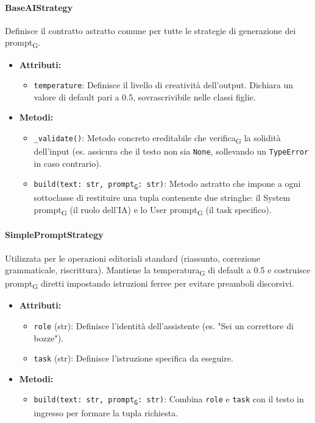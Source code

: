 \documentclass[11pt,a4paper]{article}
\newcommand{\gls}[1]{#1\textsubscript{G}}
\begin{document}
\paragraph{BaseAIStrategy}
Definisce il contratto astratto comune per tutte le strategie di generazione dei \gls{prompt}.
\begin{itemize}
    \item\textbf{Attributi:}
\begin{itemize}
    \item \texttt{temperature}: Definisce il livello di creatività dell'output. Dichiara un valore di default pari a 0.5, sovrascrivibile nelle classi figlie.
\end{itemize}
    \item \textbf{Metodi:}
\begin{itemize}
    \item \texttt{\_validate()}: Metodo concreto ereditabile che \gls{verifica} la solidità dell'input (es. assicura che il testo non sia \texttt{None}, sollevando un \texttt{TypeError} in caso contrario).
    \item \texttt{build(text: str, \gls{prompt}: str)}: Metodo astratto che impone a ogni sottoclasse di restituire una tupla contenente due stringhe: il \gls{System prompt} (il ruolo dell'IA) e lo \gls{User prompt} (il task specifico).
\end{itemize}
\end{itemize}

\paragraph{SimplePromptStrategy}
Utilizzata per le operazioni editoriali standard (riassunto, correzione grammaticale, riscrittura). Mantiene la \gls{temperatura} di default a 0.5 e costruisce \gls{prompt} diretti impostando istruzioni ferree per evitare preamboli discorsivi.
\begin{itemize}
    \item\textbf{Attributi:}
\begin{itemize}
    \item \texttt{role} (str): Definisce l'identità dell'assistente (es. "Sei un correttore di bozze").
    \item \texttt{task} (str): Definisce l'istruzione specifica da eseguire.
\end{itemize}
    \item\textbf{Metodi:}
\begin{itemize}
    \item \texttt{build(text: str, \gls{prompt}: str)}: Combina \texttt{role} e \texttt{task} con il testo in ingresso per formare la tupla richiesta.
\end{itemize}
\end{itemize}
\end{document}
